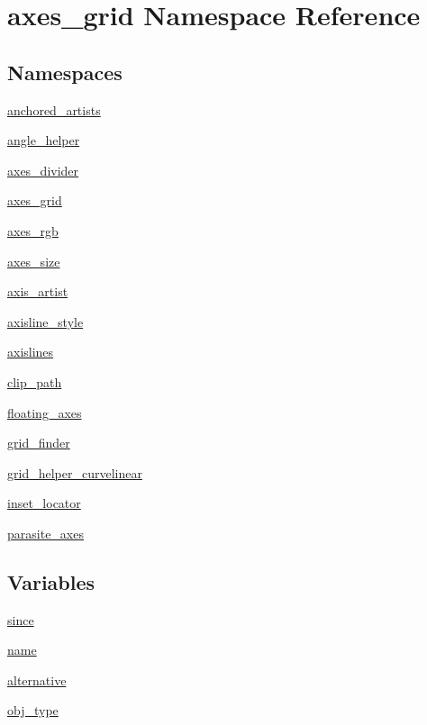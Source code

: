 \hypertarget{namespaceaxes__grid}{}\section{axes\+\_\+grid Namespace Reference}
\label{namespaceaxes__grid}
\subsection*{Namespaces}
\begin{DoxyCompactItemize}
\item 
 \hyperlink{namespaceaxes__grid_1_1anchored__artists}{anchored\+\_\+artists}
\item 
 \hyperlink{namespaceaxes__grid_1_1angle__helper}{angle\+\_\+helper}
\item 
 \hyperlink{namespaceaxes__grid_1_1axes__divider}{axes\+\_\+divider}
\item 
 \hyperlink{namespaceaxes__grid_1_1axes__grid}{axes\+\_\+grid}
\item 
 \hyperlink{namespaceaxes__grid_1_1axes__rgb}{axes\+\_\+rgb}
\item 
 \hyperlink{namespaceaxes__grid_1_1axes__size}{axes\+\_\+size}
\item 
 \hyperlink{namespaceaxes__grid_1_1axis__artist}{axis\+\_\+artist}
\item 
 \hyperlink{namespaceaxes__grid_1_1axisline__style}{axisline\+\_\+style}
\item 
 \hyperlink{namespaceaxes__grid_1_1axislines}{axislines}
\item 
 \hyperlink{namespaceaxes__grid_1_1clip__path}{clip\+\_\+path}
\item 
 \hyperlink{namespaceaxes__grid_1_1floating__axes}{floating\+\_\+axes}
\item 
 \hyperlink{namespaceaxes__grid_1_1grid__finder}{grid\+\_\+finder}
\item 
 \hyperlink{namespaceaxes__grid_1_1grid__helper__curvelinear}{grid\+\_\+helper\+\_\+curvelinear}
\item 
 \hyperlink{namespaceaxes__grid_1_1inset__locator}{inset\+\_\+locator}
\item 
 \hyperlink{namespaceaxes__grid_1_1parasite__axes}{parasite\+\_\+axes}
\end{DoxyCompactItemize}
\subsection*{Variables}
\begin{DoxyCompactItemize}
\item 
\hyperlink{namespaceaxes__grid_a3d4be314910495afdb19dadd821c65ba}{since}
\item 
\hyperlink{namespaceaxes__grid_a766b3b6327c34071a8dd2ea7af4982f8}{name}
\item 
\hyperlink{namespaceaxes__grid_a34b85bbc09a3883041090eaa041fa001}{alternative}
\item 
\hyperlink{namespaceaxes__grid_a98224bbadbb3e17faee0f19ef46fc85a}{obj\+\_\+type}
\end{DoxyCompactItemize}


